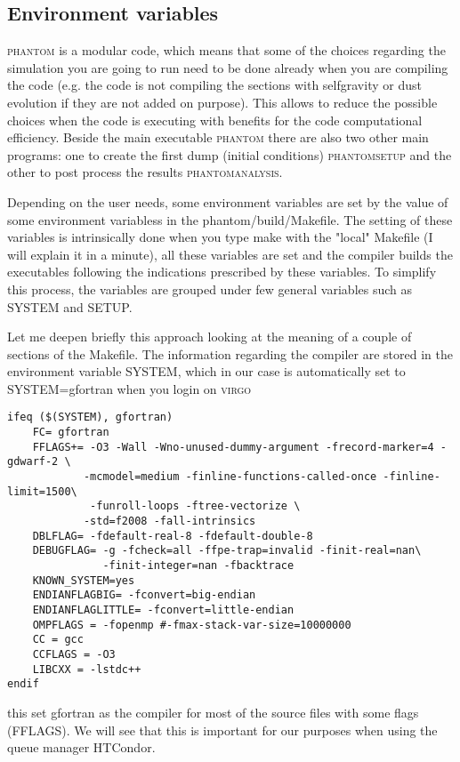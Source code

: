 \documentclass[10pt,a4paper,twoside]{article} %
\begin{document}
\subsection{Environment variables}\label{envvar}

\textsc{phantom} is a modular code, which means that some of the choices regarding the simulation you are going to run need to be done already when you are compiling the code (e.g. the code is not compiling the sections with selfgravity or dust evolution if they are not added on purpose). This allows to reduce the possible choices when the code is executing with benefits for the code computational efficiency. Beside the main executable \textsc{phantom} there are also two other main programs: one to create the first dump (initial conditions) \textsc{phantomsetup} and the other to post process the results \textsc{phantomanalysis}.

Depending on the user needs, some environment variables are set by the value of some environment variabless in the phantom/build/Makefile. The setting of these variables is intrinsically done when you type make with the "local" Makefile (I will explain it in a minute), all these variables are set and the compiler builds the executables following the indications prescribed by these variables. To simplify this process, the variables are grouped under few general variables such as SYSTEM and SETUP.

Let me deepen briefly this approach looking at the meaning of a couple of sections of the Makefile.
The information regarding the compiler are stored in the environment variable SYSTEM, which in our case is automatically set to SYSTEM=gfortran when you login on \textsc{virgo}
\begin{verbatim}
ifeq ($(SYSTEM), gfortran)
    FC= gfortran
    FFLAGS+= -O3 -Wall -Wno-unused-dummy-argument -frecord-marker=4 -gdwarf-2 \
            -mcmodel=medium -finline-functions-called-once -finline-limit=1500\
             -funroll-loops -ftree-vectorize \
            -std=f2008 -fall-intrinsics
    DBLFLAG= -fdefault-real-8 -fdefault-double-8
    DEBUGFLAG= -g -fcheck=all -ffpe-trap=invalid -finit-real=nan\
               -finit-integer=nan -fbacktrace
    KNOWN_SYSTEM=yes
    ENDIANFLAGBIG= -fconvert=big-endian
    ENDIANFLAGLITTLE= -fconvert=little-endian
    OMPFLAGS = -fopenmp #-fmax-stack-var-size=10000000
    CC = gcc
    CCFLAGS = -O3
    LIBCXX = -lstdc++
endif
\end{verbatim}
this set gfortran as the compiler for most of the source files with some flags (FFLAGS). We will see that this is important for our purposes when using the queue manager HTCondor.
\end{document}
